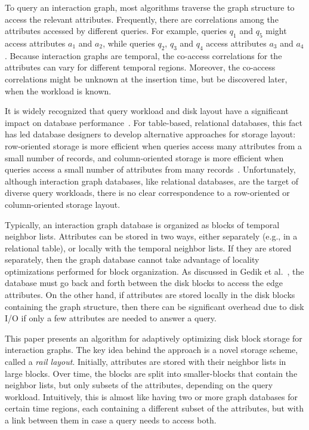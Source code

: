 To query an interaction graph, most algorithms traverse the graph structure to
access the relevant attributes.  Frequently, there are correlations among the
attributes accessed by different queries. For example, queries $q_1$ and $q_5$
might access attributes $a_1$ and $a_2$, while queries $q_2$, $q_3$ and $q_4$
access attributes $a_3$ and $a_4$. Because interaction graphs are temporal, the
co-access correlations for the attributes can vary for different
temporal regions.  Moreover, the co-access correlations might be unknown at the
insertion time, but be discovered later, when the workload is known.

It is widely recognized that query workload and disk layout have a significant
impact on database performance~\cite{alagiannis14,grund10,stonebraker05}.  For
table-based, relational databases, this fact has led database designers to
develop alternative approaches for storage layout: row-oriented storage is more
efficient when queries access many attributes from a small number of records,
and column-oriented storage is more efficient when queries access a small number
of attributes from many records~\cite{stonebraker05}.  Unfortunately, although
interaction graph databases, like relational databases, are the target of
diverse query workloads, there is no clear correspondence to a row-oriented or
column-oriented storage layout.

Typically, an interaction graph database is organized as blocks of temporal
neighbor lists.  Attributes can be stored in two ways, either separately (e.g., in a relational
table), or locally with the temporal neighbor lists.  If they are stored
separately, then the graph database cannot take advantage of locality
optimizations performed for block organization.  As discussed in Gedik et
al.~\cite{gedik14}, the database must go back and forth between the disk blocks
to access the edge attributes.  On the other hand, if attributes are stored
locally in the disk blocks containing the graph structure, then there can be
significant overhead due to disk I/O if only a few attributes are needed to
answer a query.

This paper presents an algorithm for adaptively optimizing disk block storage
for interaction graphs. The key idea behind the approach is a novel storage
scheme, called a \emph{rail layout}.  Initially, attributes are stored with
their neighbor lists in large blocks. Over time, the blocks are split into
smaller-blocks that contain the neighbor lists, but only subsets of the
attributes, depending on the query workload. Intuitively, this is almost like
having two or more graph databases for certain time regions, each containing a
different subset of the attributes, but with a link between them in case a query
needs to access both.

